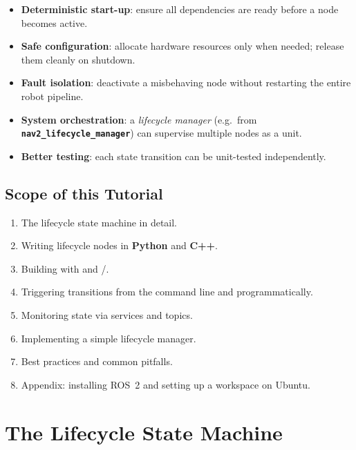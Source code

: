 \documentclass[11pt,a4paper]{csarticle}
\newcommand{\pkg}[1]{\textbf{\texttt{#1}}}
\begin{document}
\begin{itemize}[noitemsep]
  \item \textbf{Deterministic start-up}: ensure all dependencies are ready
        before a node becomes active.
  \item \textbf{Safe configuration}: allocate hardware resources only when
        needed; release them cleanly on shutdown.
  \item \textbf{Fault isolation}: deactivate a misbehaving node without
        restarting the entire robot pipeline.
  \item \textbf{System orchestration}: a \emph{lifecycle manager}
        (e.g.\ from \pkg{nav2\_lifecycle\_manager}) can supervise multiple
        nodes as a unit.
  \item \textbf{Better testing}: each state transition can be unit-tested
        independently.
\end{itemize}

\subsection{Scope of this Tutorial}

\begin{enumerate}[noitemsep]
  \item The lifecycle state machine in detail.
  \item Writing lifecycle nodes in \textbf{Python} and \textbf{C++}.
  \item Building with  and /.
  \item Triggering transitions from the command line and programmatically.
  \item Monitoring state via services and topics.
  \item Implementing a simple lifecycle manager.
  \item Best practices and common pitfalls.
  \item Appendix: installing ROS~2 and setting up a workspace on Ubuntu.
\end{enumerate}

\section{The Lifecycle State Machine}
\label{sec:statemachine}
\end{document}
